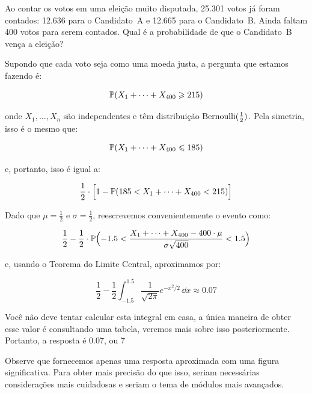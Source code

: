 \begin{example}
Ao contar os votos em uma eleição muito disputada, 25.301 votos já foram contados: 12.636 para o Candidato~A e 12.665 para o Candidato~B. Ainda faltam 400 votos para serem contados. Qual é a probabilidade de que o Candidato~B vença a eleição?

Supondo que cada voto seja como uma moeda justa, a pergunta que estamos fazendo é:

\[
\mathbb{P}( X_1 + \dots + X_{400} \geqslant 215 )
\]

onde $ X_1,\dots,X_n $ são independentes e têm distribuição $ \mathrm{Bernoulli}(\frac{1}{2}) $. Pela simetria, isso é o mesmo que:

\[
\mathbb{P}( X_1 + \dots + X_{400} \leqslant 185 )
\]

e, portanto, isso é igual a:

\[
\frac{1}{2} \cdot \Big[ 1 - \mathbb{P}( 185 < X_1 + \dots + X_{400} < 215 ) \Big]
\]

Dado que $ \mu = \frac{1}{2} $ e $ \sigma = \frac{1}{2} $, reescrevemos convenientemente o evento como:

\[
\frac{1}{2} - \frac{1}{2} \cdot
\mathbb{P}\Big( {-}1.5 < \frac{X_1 + \dots + X_{400}-400\cdot \mu}{\sigma \sqrt{400}} < 1.5 \Big)
\]

e, usando o Teorema do Limite Central, aproximamos por:

\[
\frac{1}{2} - \frac{1}{2} \int_{-1.5}^{1.5} \frac{1}{\sqrt{2 \pi}}
e^{-x^2/2} \, \dd x
\approx
0.07
\]

Você não deve tentar calcular esta integral em casa, a única maneira de obter esse valor é consultando uma tabela, veremos mais sobre isso posteriormente. Portanto, a resposta é 0.07, ou 7%

Observe que fornecemos apenas uma resposta aproximada com uma figura significativa. Para obter mais precisão do que isso, seriam necessárias considerações mais cuidadosas e seriam o tema de módulos mais avançados.
\end{example}

